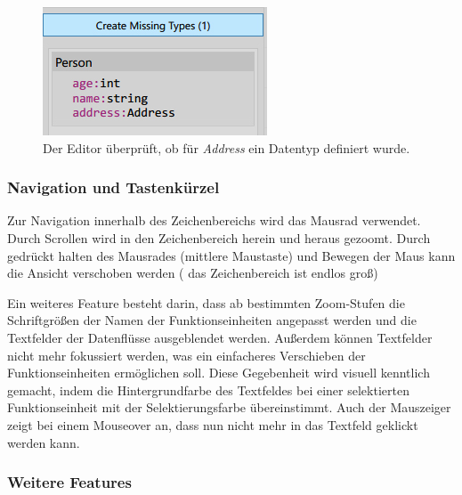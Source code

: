 	\begin{figure}[H]
		\centering
		\includegraphics[width=0.4\linewidth]{./img/datatypes.jpg} 
		\caption{Der Editor überprüft, ob für \textit{Address} ein Datentyp definiert wurde.}
	\end{figure}
	
		

	
\subsubsection{Navigation und Tastenkürzel}

	Zur Navigation innerhalb des Zeichenbereichs wird das Mausrad verwendet.
	Durch Scrollen wird in den Zeichenbereich herein und heraus gezoomt.
	Durch gedrückt halten des Mausrades (mittlere Maustaste) und Bewegen der
	Maus kann die Ansicht verschoben werden ( das Zeichenbereich ist endlos groß)
	
	Ein weiteres Feature besteht darin, dass ab bestimmten Zoom-Stufen die
	Schriftgrößen der Namen der Funktionseinheiten angepasst werden und die 
	Textfelder der Datenflüsse ausgeblendet werden.
	Außerdem können Textfelder nicht mehr fokussiert werden, was ein einfacheres
	Verschieben der Funktionseinheiten ermöglichen soll. Diese Gegebenheit wird
	visuell kenntlich gemacht, indem die Hintergrundfarbe des Textfeldes bei
	einer selektierten Funktionseinheit mit der Selektierungsfarbe übereinstimmt.
	Auch der Mauszeiger zeigt bei einem Mouseover an, dass nun nicht mehr in
	das Textfeld geklickt werden kann.
	
	
	\subsubsection{Weitere Features}

